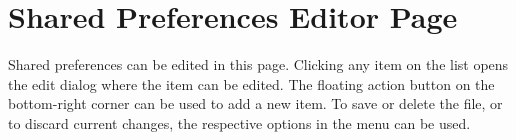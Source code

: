 \section{Shared Preferences Editor Page}\label{sec:shared-preferences-editor-page}
Shared preferences can be edited in this page. Clicking any item on the list opens the edit dialog where the item can be
edited. The floating action button on the bottom-right corner can be used to add a new item. To save or delete the file,
or to discard current changes, the respective options in the menu can be used.